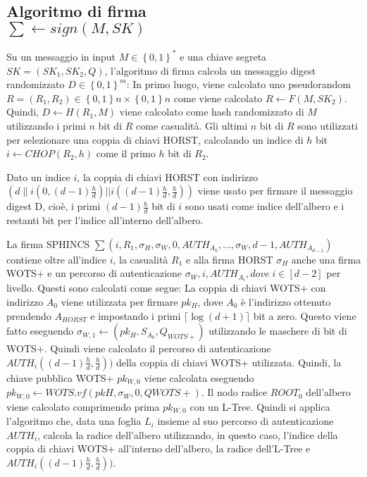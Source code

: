 \subsection{Algoritmo di firma\\\(\sum \leftarrow sign(M, SK)\)}
Su un messaggio in input \(M \in \left\{0,1\right\}^*\) e una chiave segreta \(SK = \left(SK_1,SK_2,Q\right)\), l'algoritmo di firma calcola un messaggio digest randomizzato \(D \in \left\{0,1\right\}^m\): In primo luogo, viene calcolato uno pseudorandom \(R = (R_1, R_2) \in \left\{0, 1\right\}n \times \left\{0, 1\right\}n\) come viene calcolato \(R \leftarrow F(M, SK_2)\). Quindi, \(D \leftarrow H(R_1,M)\) viene calcolato come hash randomizzato di \(M\) utilizzando i primi \(n\) bit di \(R\) come casualità. Gli ultimi \(n\) bit di \(R\) sono utilizzati per selezionare una coppia di chiavi HORST, calcolando un indice di \(h\) bit \(i \leftarrow CHOP(R_2 , h)\) come il primo \(h\) bit di \(R_2\).

Dato un indice \(i\), la coppia di chiavi HORST con indirizzo \((d\|i(0, (d - 1)\frac{h}{d})||i((d - 1)\frac{h}{d}, \frac{h}{d}))\) viene usato per firmare il messaggio digest D, cioè, i primi \((d - 1)\frac{h}{d}\) bit di \(i\) sono usati come indice dell'albero e i restanti bit per l'indice all'interno dell'albero.

La firma SPHINCS \( \sum(i, R_1, \sigma_H, \sigma_W,0, AUTH_{A_0} , . . . , \sigma_W,d-1, AUTH_{A_{d-1}}) \) contiene oltre all'indice \(i\), la casualità \(R_1\) e alla firma HORST \(\sigma_H\) anche una firma WOTS+ e un percorso di autenticazione \(\sigma_W,i, AUTH_{A_i} , dove \; i \in [d-2]\) per livello. Questi sono calcolati come segue: La coppia di chiavi WOTS+ con indirizzo \(A_0\) viene utilizzata per firmare \(pk_H\), dove \(A_0\) è l'indirizzo ottenuto prendendo \(A_{HORST}\) e impostando i primi \(\lceil \log(d + 1)\rceil\) bit a zero. Questo viene fatto eseguendo \(\sigma_{W,1} \leftarrow (pk_H, S_{A_0} , Q_{WOTS+} )\) utilizzando le maschere di bit di WOTS+. Quindi viene calcolato il percorso di autenticazione \(AUTH_i((d-1)\frac{h}{d},\frac{h}{d}))\) della coppia di chiavi WOTS+ utilizzata. Quindi, la chiave pubblica WOTS+ \(pk_{W,0}\) viene calcolata eseguendo \\ \(pk_{W,0} \leftarrow WOTS.vf(pkH, \sigma_W, 0, QWOTS+)\). Il nodo radice \(ROOT_0\) dell'albero viene calcolato comprimendo prima \(pk_{W,0}\) con un L-Tree. Quindi si applica l'algoritmo che,  data una foglia \(L_i\) insieme al suo percorso di autenticazione \(AUTH_i\), calcola la radice dell'albero utilizzando, in questo caso, l'indice della coppia di chiavi WOTS+ all'interno dell'albero, la radice dell'L-Tree e \(AUTH_i((d-1)\frac{h}{d},\frac{h}{d}))\).

